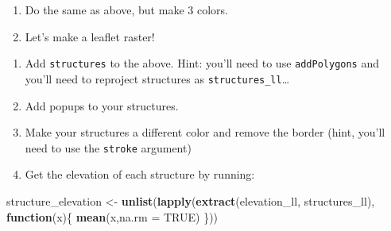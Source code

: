 \documentclass[
]{book}
\newenvironment{Shaded}{\begin{snugshade}}{\end{snugshade}}
\newcommand{\ControlFlowTok}[1]{\textcolor[rgb]{0.13,0.29,0.53}{\textbf{#1}}}
\newcommand{\DataTypeTok}[1]{\textcolor[rgb]{0.13,0.29,0.53}{#1}}
\newcommand{\FloatTok}[1]{\textcolor[rgb]{0.00,0.00,0.81}{#1}}
\newcommand{\KeywordTok}[1]{\textcolor[rgb]{0.13,0.29,0.53}{\textbf{#1}}}
\newcommand{\NormalTok}[1]{#1}
\newcommand{\OperatorTok}[1]{\textcolor[rgb]{0.81,0.36,0.00}{\textbf{#1}}}
\newcommand{\OtherTok}[1]{\textcolor[rgb]{0.56,0.35,0.01}{#1}}
\newcommand{\StringTok}[1]{\textcolor[rgb]{0.31,0.60,0.02}{#1}}
\begin{document}
\begin{enumerate}
\def\labelenumi{\arabic{enumi}.}
\setcounter{enumi}{33}
\item
  Do the same as above, but make 3 colors.
\item
  Let's make a leaflet raster!
\end{enumerate}

\begin{Shaded}
\end{Shaded}

\begin{enumerate}
\def\labelenumi{\arabic{enumi}.}
\setcounter{enumi}{35}
\item
  Add \texttt{structures} to the above. Hint: you'll need to use \texttt{addPolygons} and you'll need to reproject structures as \texttt{structures\_ll}\ldots{}
\item
  Add popups to your structures.
\item
  Make your structures a different color and remove the border (hint, you'll need to use the \texttt{stroke} argument)
\item
  Get the elevation of each structure by running:
\end{enumerate}

\begin{Shaded}
\begin{Highlighting}[]
\NormalTok{structure_elevation <-}\StringTok{ }
\StringTok{  }\KeywordTok{unlist}\NormalTok{(}\KeywordTok{lapply}\NormalTok{(}\KeywordTok{extract}\NormalTok{(elevation_ll, structures_ll),}
         \ControlFlowTok{function}\NormalTok{(x)\{}
           \KeywordTok{mean}\NormalTok{(x,}\DataTypeTok{na.rm =} \OtherTok{TRUE}\NormalTok{)}
\NormalTok{         \}))}
\end{Highlighting}
\end{Shaded}
\end{document}
